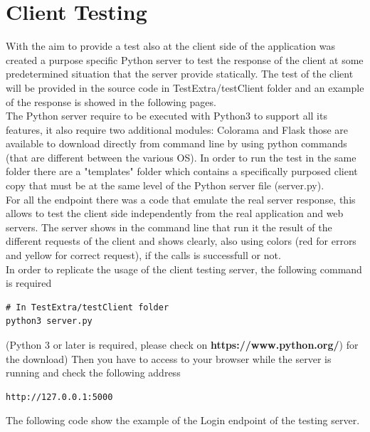 \documentclass[numbers=noenddot, 12pt, a4paper, oneside]{scrbook}
\begin{document}
\section*{Client Testing}
With the aim to provide a test also at the client side of the application was created a purpose specific Python server to test the response of the client at some predetermined situation that the server provide statically. 
The test of the client will be provided in the source code in TestExtra/testClient folder and an example of the response is showed in the following pages. \\\newline
The Python server require to be executed with Python3 to support all its features, it also require two additional modules: Colorama and Flask those are available to download directly from command line by using python commands (that are different between the various OS).
In order to run the test in the same folder there are a "templates" folder which contains a specifically purposed client copy that must be at the same level of the Python server file (server.py).\\\newline
For all the endpoint there was a code that emulate the real server response, this allows to test the client side independently from the real application and web servers.
The server shows in the command line that run it the result of the different requests of the client and shows clearly, also using colors (red for errors and yellow for correct request), if the calls is successfull or not. \\\newline
In order to replicate the usage of the client testing server, the following command is required 
\begin{lstlisting}
# In TestExtra/testClient folder
python3 server.py
\end{lstlisting}
(Python 3 or later is required, please check on \textbf{https://www.python.org/}) for the download)
Then you have to access to your browser while the server is running and check the following address
\begin{lstlisting}
http://127.0.0.1:5000
\end{lstlisting}The following code show the example of the Login endpoint of the testing server.
\end{document}
